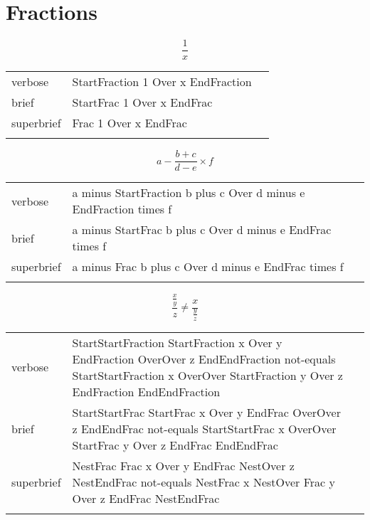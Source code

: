 
\section{Fractions}
\label{sec:fractions}

\R
\E \[\frac{1}{x}\]
\begin{longtable}[c]{@{}lll@{}}
\toprule\addlinespace
verbose & StartFraction 1 Over x EndFraction &

\\\addlinespace
brief & StartFrac 1 Over x EndFrac &

\\\addlinespace
superbrief & Frac 1 Over x EndFrac &

\\\addlinespace
\bottomrule
\end{longtable}


\E \[a-\frac{b+c}{d-e}\times f\]
\begin{longtable}[c]{@{}lll@{}}
\toprule\addlinespace
verbose & a minus StartFraction b plus c Over d minus e EndFraction
times f &

\\\addlinespace
brief & a minus StartFrac b plus c Over d minus e EndFrac times f &

\\\addlinespace
superbrief & a minus Frac b plus c Over d minus e EndFrac times f &

\\\addlinespace
\bottomrule
\end{longtable}


\R
\E \[\frac{\frac{x}{y}}{z}\neq \frac{x}{\frac{y}{z}}\]
\begin{longtable}[c]{@{}lll@{}}
\toprule\addlinespace
verbose & StartStartFraction StartFraction x Over y EndFraction OverOver
z EndEndFraction not-equals StartStartFraction x OverOver StartFraction
y Over z EndFraction EndEndFraction &

\\\addlinespace
brief & StartStartFrac StartFrac x Over y EndFrac OverOver z EndEndFrac
not-equals StartStartFrac x OverOver StartFrac y Over z EndFrac
EndEndFrac &

\\\addlinespace
superbrief & NestFrac Frac x Over y EndFrac NestOver z NestEndFrac
not-equals NestFrac x NestOver Frac y Over z EndFrac NestEndFrac &

\\\addlinespace
\bottomrule
\end{longtable}


